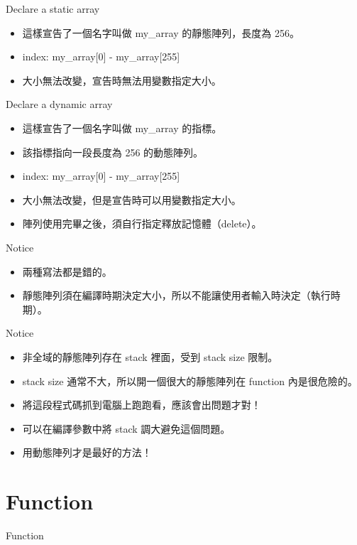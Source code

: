 \documentclass[t]{beamer}
\begin{document}
\begin{frame}{Declare a static array}
  
  \begin{itemize}
    \item 這樣宣告了一個名字叫做 my\_array 的靜態陣列，長度為 256。
    \item index: my\_array[0] - my\_array[255]
    \item 大小無法改變，宣告時無法用變數指定大小。
  \end{itemize}
\end{frame}

\begin{frame}{Declare a dynamic array}
  
  \begin{itemize}
    \item 這樣宣告了一個名字叫做 my\_array 的指標。
    \item 該指標指向一段長度為 256 的動態陣列。
    \item index: my\_array[0] - my\_array[255]
    \item 大小無法改變，但是宣告時可以用變數指定大小。
    \item 陣列使用完畢之後，須自行指定釋放記憶體（delete）。
  \end{itemize}
\end{frame}

\begin{frame}{Notice}
  
  \begin{itemize}
    \item 兩種寫法都是錯的。
    \item 靜態陣列須在編譯時期決定大小，所以不能讓使用者輸入時決定（執行時期）。
  \end{itemize}
\end{frame}

\begin{frame}{Notice}
  
  \begin{itemize}
    \item 非全域的靜態陣列存在 stack 裡面，受到 stack size 限制。
    \item stack size 通常不大，所以開一個很大的靜態陣列在 function 內是很危險的。
    \item 將這段程式碼抓到電腦上跑跑看，應該會出問題才對！
    \item 可以在編譯參數中將 stack 調大避免這個問題。
    \item 用動態陣列才是最好的方法！
  \end{itemize}
\end{frame}

\section{Function}
\begin{frame}{Function}
  
\end{frame}
\end{document}
